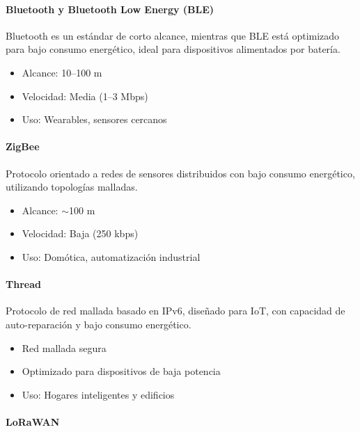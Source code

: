 \documentclass[conference]{IEEEtran}
\begin{document}
\paragraph{\textbf{Bluetooth y Bluetooth Low Energy (BLE)}}

Bluetooth es un estándar de corto alcance, mientras que BLE está optimizado para bajo consumo energético, ideal para dispositivos alimentados por batería.

\begin{itemize}
    \item Alcance: 10–100 m
    \item Velocidad: Media (1–3 Mbps)
    \item Uso: Wearables, sensores cercanos
\end{itemize}

\paragraph{\textbf{ZigBee}}

Protocolo orientado a redes de sensores distribuidos con bajo consumo energético, utilizando topologías malladas.

\begin{itemize}
    \item Alcance: $\sim$100 m
    \item Velocidad: Baja (250 kbps)
    \item Uso: Domótica, automatización industrial
\end{itemize}

\paragraph{\textbf{Thread}}

Protocolo de red mallada basado en IPv6, diseñado para IoT, con capacidad de auto-reparación y bajo consumo energético.

\begin{itemize}
    \item Red mallada segura
    \item Optimizado para dispositivos de baja potencia
    \item Uso: Hogares inteligentes y edificios
\end{itemize}

\paragraph{\textbf{LoRaWAN}}
\end{document}
